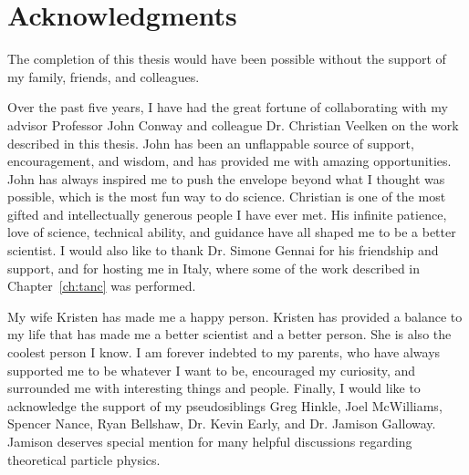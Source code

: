 \ifx\master\undefined\fi

\prelimheaders

\chapter*{Acknowledgments}

The completion of this thesis would have been possible without the 
support of my family, friends, and colleagues.

Over the past five years, I have had the great fortune of collaborating with my
advisor Professor John Conway and colleague Dr. Christian Veelken on the work
described in this thesis.  John has been an unflappable source of support,
encouragement, and wisdom, and has provided me with amazing opportunities.  John
has always inspired me to push the envelope beyond what I thought was possible,
which is the most fun way to do science.  Christian is one of the most gifted and
intellectually generous people I have ever met.  His infinite patience, love of
science, technical ability, and guidance have all shaped me to be a
better scientist.  I would also like to thank Dr. Simone Gennai for his
friendship and support, and for hosting me in Italy, where some of the work
described in Chapter~\ref{ch:tanc} was performed.

My wife Kristen has made me a happy person.  Kristen has provided a balance to
my life that has made me a better scientist and a better person.  She is also
the coolest person I know.  I am forever indebted to my parents, who have always
supported me to be whatever I want to be, encouraged my curiosity, and
surrounded me with interesting things and people.  Finally, I would like to
acknowledge the support of my pseudosiblings Greg Hinkle, Joel McWilliams,
Spencer Nance, Ryan Bellshaw, Dr. Kevin Early, and Dr. Jamison Galloway.
Jamison deserves special mention for many helpful discussions regarding
theoretical particle physics.

\ifx\master\undefined\fi
